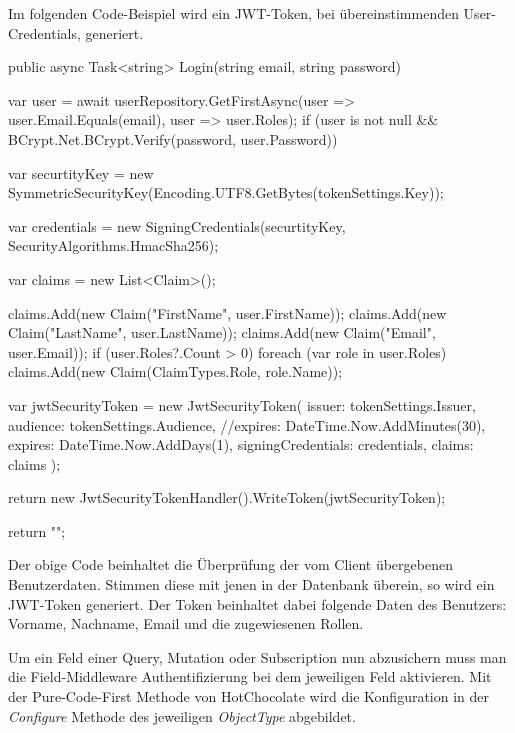 Im folgenden Code-Beispiel wird ein JWT-Token, bei übereinstimmenden User-Credentials, generiert.

\begin{JsCode}
public async Task<string> Login(string email, string password) {

    var user = await userRepository.GetFirstAsync(user => user.Email.Equals(email), user => user.Roles);
    if (user is not null && BCrypt.Net.BCrypt.Verify(password, user.Password)) {
        var securtityKey = new SymmetricSecurityKey(Encoding.UTF8.GetBytes(tokenSettings.Key));

        var credentials = new SigningCredentials(securtityKey, SecurityAlgorithms.HmacSha256);

        var claims = new List<Claim>();

        claims.Add(new Claim("FirstName", user.FirstName));
        claims.Add(new Claim("LastName", user.LastName));
        claims.Add(new Claim("Email", user.Email));
        if (user.Roles?.Count > 0) {
            foreach (var role in user.Roles) {
                claims.Add(new Claim(ClaimTypes.Role, role.Name));
            }
        }

        var jwtSecurityToken = new JwtSecurityToken(
            issuer: tokenSettings.Issuer,
            audience: tokenSettings.Audience,
            //expires: DateTime.Now.AddMinutes(30),
            expires: DateTime.Now.AddDays(1),
            signingCredentials: credentials,
            claims: claims
        );

        return new JwtSecurityTokenHandler().WriteToken(jwtSecurityToken);
    }

    return "";
}
\end{JsCode}

Der obige Code beinhaltet die Überprüfung der vom Client übergebenen Benutzerdaten.
Stimmen diese mit jenen in der Datenbank überein, so wird ein JWT-Token generiert.
Der Token beinhaltet dabei folgende Daten des Benutzers: Vorname, Nachname, Email und die zugewiesenen Rollen.

Um ein Feld einer Query, Mutation oder Subscription nun abzusichern muss man die Field-Middleware Authentifizierung bei dem jeweiligen Feld aktivieren.
Mit der Pure-Code-First Methode von HotChocolate wird die Konfiguration in der \textit{Configure} Methode des jeweiligen \textit{ObjectType} abgebildet.

